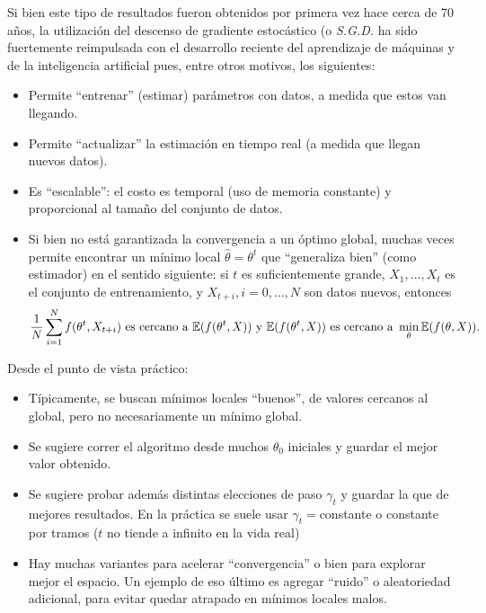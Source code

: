 \begin{remark}

Si bien este tipo de resultados fueron obtenidos por primera vez hace cerca de 70 años, la utilizaci\'on del descenso de gradiente estocástico (o \textit{S.G.D.}  ha sido fuertemente reimpulsada con el desarrollo reciente  del aprendizaje de máquinas y de la inteligencia artificial pues, entre otros motivos, los siguientes: 
\begin{itemize}
    \item Permite ``entrenar'' (estimar) parámetros con datos,  a medida que estos  van llegando.
    \item Permite ``actualizar'' la estimación en tiempo real (a medida que llegan nuevos datos).
    \item Es ``escalable'': el costo es temporal (uso de memoria constante) y proporcional al tamaño del conjunto de datos.
    \item Si bien no está garantizada la convergencia a un óptimo global, muchas veces permite encontrar un mínimo local $\hat{\theta}=\theta^t$ que ``generaliza bien'' (como estimador) en el sentido siguiente:  si $t$ es suficientemente grande,  $X_1,\dots,X_t$ es el conjunto de entrenamiento,  y  $X_{t+i}, i=0,\dots, N$ son datos nuevos,  entonces
    $$ \displaystyle\frac{1}{N}\sum^N_{i=1}f(\theta^t,X_{t+i})\mbox{ es cercano a }\mathbb{E}(f(\theta^t,X)) \mbox{ y } \mathbb{E}(f(\theta^t,X)) \mbox{ es cercano a } \min_\theta \mathbb{E}(f(\theta,X)). $$
\end{itemize}
\end{remark}
   
\begin{remark} Desde el punto de vista pr\'actico: 
\begin{itemize}
\item Típicamente, se buscan mínimos locales ``buenos'', de valores cercanos al global, pero no necesariamente un m\'inimo global.
    \item Se sugiere correr el algoritmo desde muchos $\theta_0$ iniciales y guardar el mejor valor obtenido.
    \item Se sugiere probar adem\'as distintas elecciones de paso $\gamma_t$ y guardar la que de mejores resultados. En la práctica se suele usar $\gamma_t=$constante o constante por tramos ($t$ no tiende a infinito en la vida real)
    \item Hay muchas variantes para acelerar ``convergencia'' o bien para explorar mejor el espacio. Un ejemplo de eso \'ultimo es agregar ``ruido'' o aleatoriedad adicional,  para evitar quedar atrapado en  mínimos locales malos.
    \end{itemize}
\end{remark}
